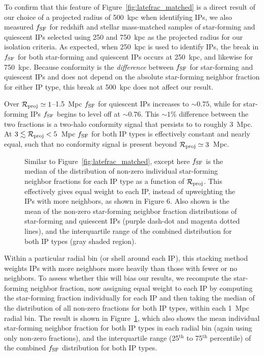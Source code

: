 To confirm that this feature of Figure~\ref{fig:latefrac_matched} is a direct result of our choice of a
projected radius of 500~kpc when identifying IPs, we also measured $\flate$ for redshift and stellar 
mass-matched samples of star-forming and quiescent IPs selected using 250 and 750~kpc as the projected 
radius for our isolation criteria.
As expected, when 250~kpc is used to identify IPs, the break in $\flate$ 
for both star-forming and quiescent IPs occurs at 250~kpc, and likewise for 750~kpc.
Because conformity is the \emph{difference} between $\flate$ for star-forming and quiescent IPs and does
not depend on the absolute star-forming neighbor fraction for either IP type, this break at 500~kpc does
not affect our result.

Over $\mathcal{R}_{\text{proj}}\simeq1$--1.5~Mpc $\flate$ for quiescent IPs increases to $\sim0.75$, while for star-forming IPs $\flate$ begins to level off at $\sim0.76$.  This $\sim1$\% difference between the two fractions is a two-halo conformity signal that persists to to roughly 3~Mpc.  At $3\lesssim\mathcal{R}_{\text{proj}}<5$~Mpc $\flate$ for both IP types is effectively constant and nearly equal, such that no conformity signal is present beyond $\mathcal{R}_{\text{proj}}\simeq3$~Mpc.


\begin{figure}
  \epstrim{0.5in 0.1in 0.3in 0.3in}
  \caption{
Similar to Figure~\ref{fig:latefrac_matched}, except here $\flate$ is the median of 
the distribution of non-zero individual star-forming neighbor fractions for each IP type as a function of $\mathcal{R}_{\text{proj}}$.  This effectively gives equal weight to each IP, instead of upweighting the IPs with more neighbors, as shown in Figure 6.
Also shown is the mean of the non-zero star-forming neighbor fraction distributions of star-forming and quiescent IPs (purple dash-dot and magenta dotted lines),
and the interquartile range of the combined distribution for both IP types (gray shaded region).
}
  \label{fig:latefrac_quartiles}
\end{figure}

Within a particular radial bin (or shell around each IP), this stacking method 
weights IPs with more neighbors more heavily than those with fewer or no neighbors.
To assess whether this will bias our results, we recompute the star-forming neighbor fraction, 
now assigning equal weight to each IP by computing the star-forming fraction 
individually for each IP and then taking the median of the distribution of all 
non-zero fractions for both IP types, within each 1~Mpc radial bin.
The result is shown in Figure~\ref{fig:latefrac_quartiles}, which also shows the 
mean individual star-forming neighbor fraction for both IP types in each radial bin (again using
only non-zero fractions), and the interquartile range (25$^{\textrm{th}}$ to 75$^{\textrm{th}}$ percentile) of the combined $\flate$ distribution for both IP types.

